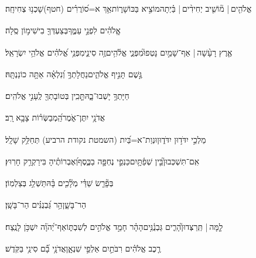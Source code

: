 \documentclass[12pt]{article}
\newcommand{\loc}[1]{\textsuperscript{\locf{#1}}}
\begin{document}
{\loc{ ז}~}‏אֱלֹהִ֤ים |  מ֘וֹשִׁ֤יב יְחִידִ֨ים |  בַּ֗יְתָה{\hfill}מוֹצִ֣יא  בַּכּוֹשָׁר֑וֹת\newline\hspace*{.5em}אַ֥ךְ א=ס֝וֹרֲרִ֗ים (חטף){\hfill}שָׁכְנ֥וּ צְחִיחָֽה׃\par

{\loc{ ח}~}‏אֱֽלֹהִ֗ים  לִפְנֵ֣י עַמֶּ֑ךָ{\hfill}בְּצַעְדְּךָ֖ בִישִׁימ֣וֹן סֶֽלָה׃\par

{\loc{ ט}~}‏אֶ֤רֶץ רָעָ֨שָׁה |  אַף־שָׁמַ֣יִם נָטְפוּ֮{\hfill}מִפְּנֵ֢י אֱלֹ֫הִ֥ים\newline\hspace*{.5em}זֶ֥ה סִינַ֑י{\hfill}מִפְּנֵ֥י אֱ֝לֹהִ֗ים אֱלֹהֵ֥י יִשְׂרָאֵֽל׃\par

{\loc{ י}~}‏גֶּ֣שֶׁם  תָּנִ֣יף אֱלֹהִ֑ים{\hfill}נַחֲלָתְךָ֥ וְ֝נִלְאָ֗ה אַתָּ֥ה כוֹנַנְתָּֽהּ׃\par

{\loc{ יא}~}‏חַיָּתְךָ֥ יָשְׁבוּ־בָ֑הּ{\hfill}תָּ֤כִֽין בְּטוֹבָתְךָ֖ לֶֽעָנִ֣י אֱלֹהִֽים׃\par

{\loc{ יב}~}‏אֲדֹנָ֥י יִתֶּן־אֹ֑מֶר{\hfill}הַֽ֝מְבַשְּׂר֗וֹת צָבָ֥א רָֽב׃\par

{\loc{ יג}~}‏מַלְכֵ֣י  יִדֹּד֣וּן יִדֹּד֑וּן{\hfill}וּנְוַת־א=בַּ֝יִת (השמטת נקודת הרביע) תְּחַלֵּ֥ק שָׁלָֽל׃\par

{\loc{ יד}~}‏אִֽם־תִּשְׁכְּבוּן֮{\hfill}בֵּ֤ין שְׁפַ֫תָּ֥יִם\newline\hspace*{.5em}כַּנְפֵ֣י  נֶחְפָּ֣ה בַכֶּ֑סֶף{\hfill}וְ֝אֶבְרוֹתֶ֗יהָ בִּירַקְרַ֥ק חָרֽוּץ׃\par

{\loc{ טו}~}‏בְּפָ֘רֵ֤שׂ שַׁדַּ֓י מְלָ֘כִ֤ים בָּ֗הּ{\hfill}תַּשְׁלֵ֥ג בְּצַלְמֽוֹן׃\par

{\loc{ טז}~}‏ הַר־בָּשָׁ֑ן{\hfill}הַ֥ר גַּ֝בְנֻנִּ֗ים הַר־בָּשָֽׁן׃\par

{\loc{ יז}~}‏לָ֤מָּה |  תְּֽרַצְּדוּן֮{\hfill}הָרִ֢ים גַּבְנֻ֫נִּ֥ים\newline\hspace*{.5em}הָהָ֗ר חָמַ֣ד אֱלֹהִ֣ים לְשִׁבְתּ֑וֹ{\hfill}אַף־יְ֝הֹוָ֗ה יִשְׁכֹּ֥ן לָנֶֽצַח׃\par

{\loc{ יח}~}‏רֶ֤כֶב אֱלֹהִ֗ים רִבֹּתַ֣יִם אַלְפֵ֣י שִׁנְאָ֑ן{\hfill}אֲדֹנָ֥י בָֿ֝֗ם סִינַ֥י בַּקֹּֽדֶשׁ׃\par
\end{document}
